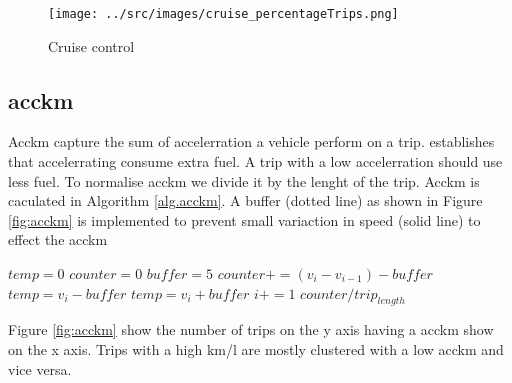 \begin{figure}
\centering
\texttt{[image: ../src/images/cruise\_percentageTrips.png]}
\caption{Cruise control}
\label{fig:cruiseTrips}
\end{figure}

\subsection{acckm}

Acckm capture the sum of accelerration a vehicle perform on a trip. \cite{} establishes that accelerrating consume extra fuel. A trip with a low accelerration should use less fuel. To normalise acckm we divide it by the lenght of the trip. Acckm is caculated in Algorithm \ref{alg.acckm}. A buffer (dotted line) as shown in Figure \ref{fig:acckm} is implemented to prevent small variaction in speed (solid line) to effect the acckm

\begin{algorithm}
\caption{$acckm$}\label{alg.acckm}
\begin{algorithmic}[1]
\State $temp = 0$
\State $counter = 0$
\State $buffer = 5$
	\State $counter += (v_i - v_{i-1}) - buffer$
	\State $temp = v_i - buffer$
	\State $temp = v_i + buffer$
\EndIf
\State $i+=1$
\EndWhile
\State \Return $ counter / trip_{length}$

\end{algorithmic}
\end{algorithm}

Figure \ref{fig:acckm} show the number of trips on the y axis having a acckm show on the x axis. Trips with a high km/l are mostly clustered with a low acckm and vice versa. 


